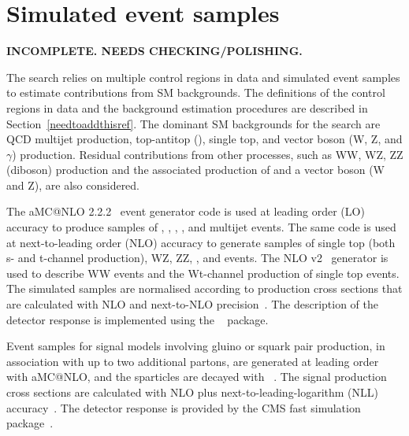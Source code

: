 \section{Simulated event samples}
\label{sec:simulation}

{\bf INCOMPLETE. NEEDS CHECKING/POLISHING.}

The search relies on multiple control regions in data and simulated
event samples to estimate contributions from SM backgrounds. The
definitions of the control regions in data and the background
estimation procedures are described in
Section~\ref{needtoaddthisref}. The dominant SM backgrounds for the
search are QCD multijet production, top-antitop (\ttbar), single top,
and vector boson (W, Z, and $\gamma$) production. Residual
contributions from other processes, such as WW, WZ, ZZ (diboson)
production and the associated production of \ttbar and a vector boson
(W and Z), are also considered.

The  aMC@NLO 2.2.2~\cite{Alwall2014} event generator code is
used at leading order (LO) accuracy to produce samples of \wj, \zj,
\gj, \ttbar, and multijet events. The same code is used at
next-to-leading order (NLO) accuracy to generate samples of single top
(both s- and t-channel production), WZ, ZZ, \ttw, and \ttz events. The
NLO \POWHEG v2~\cite{powheg, powheg_top_Wt} generator is used to
describe WW events and the Wt-channel production of single top
events. The simulated samples are normalised according to production
cross sections that are calculated with NLO and next-to-NLO
precision~\cite{Alwall2014, wphys, fewz, wwxs, top++, nlotop,
  powheg_top_Wt}. The description of the detector response is
implemented using the \GEANTfour~\cite{geant} package.

Event samples for signal models involving gluino or squark pair
production, in association with up to two additional partons, are
generated at leading order with  aMC@NLO, and the sparticles
are decayed with ~\cite{pythia}. The signal production cross
sections are calculated with NLO plus next-to-leading-logarithm (NLL)
accuracy~\cite{Beenakker:1996ch, PhysRevLett.102.111802,
  PhysRevD.80.095004, 1126-6708-2009-12-041,
  doi:10.1142/S0217751X11053560, susynlo}. The detector response is
provided by the CMS fast simulation package~\cite{fastsim}. 


